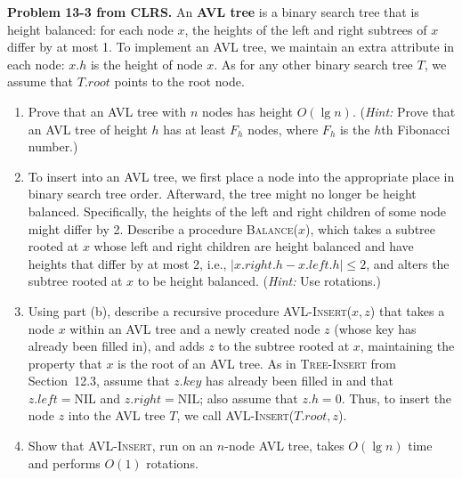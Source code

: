 \documentclass[11pt,letterpaper]{article}
\begin{document}
\noindent
\textbf{Problem 13-3 from CLRS.} 
An \textbf{AVL tree} is a binary search tree that is height
balanced: for each node $x$, the heights of the left
and right subtrees of $x$ differ by at most 1. To implement
an AVL tree, we maintain an extra attribute in each node:
$x.h$ is the height of node $x$. As for any other binary
search tree $T$, we assume that $T.root$ points to the root
node.
\begin{enumerate}[label=\alph*),labelindent=0pt]
\item Prove that an AVL tree with $n$ nodes has height
$O(\lg n)$. (\textit{Hint:} Prove that an AVL tree of height
$h$ has at least $F_h$ nodes, where $F_h$ is the $h$th
Fibonacci number.)
\item To insert into an AVL tree, we first place a node into
the appropriate place in binary search tree order.
Afterward, the tree might no longer be height balanced.
Specifically, the heights of the left and right children of
some node might differ by 2. Describe a procedure
\textsc{Balance($x$)}, which takes a subtree rooted at $x$
whose left and right children are height balanced and have
heights that differ by at most 2, i.e., $|x.right.h -
x.left.h| \leq 2$, and alters the subtree rooted at $x$ to
be height balanced. (\textit{Hint:} Use rotations.)
\item Using part (b), describe a recursive procedure
\textsc{AVL-Insert($x,z$)} that takes a node $x$ within an
AVL tree and a newly created node $z$ (whose key has already
been filled in), and adds $z$ to the subtree rooted at $x$,
maintaining the property that $x$ is the root of an AVL
tree. As in \textsc{Tree-Insert} from Section~12.3, assume
that $z.key$ has already been filled in and that
$z.left=\text{NIL}$ and $z.right=\text{NIL}$; also assume
that $z.h=0$. Thus, to insert the node $z$ into the AVL tree
$T$, we call \textsc{AVL-Insert($T.root, z$)}.
\item Show that \textsc{AVL-Insert}, run on an $n$-node AVL
tree, takes $O(\lg n)$ time and performs $O(1)$ rotations.
\end{enumerate}
\end{document}
